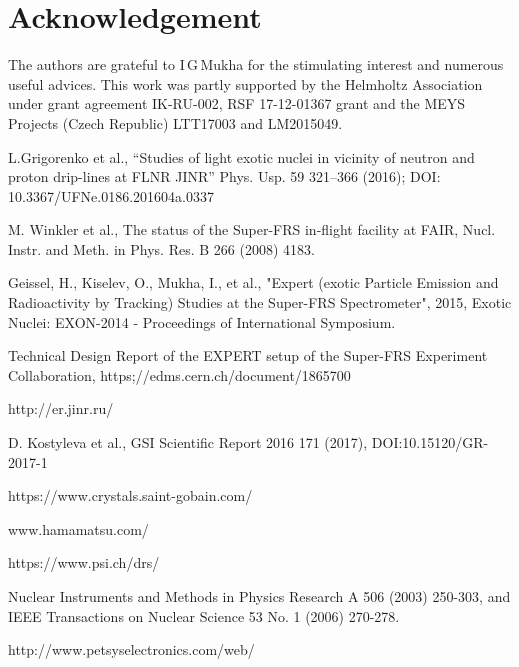 \documentclass{webofc}
\begin{document}
\section{Acknowledgement}
The authors are grateful to I\,G\,Mukha for the stimulating interest and numerous useful advices.
This  work was partly supported by the Helmholtz Association under grant agreement IK-RU-002, RSF 17-12-01367 grant and the MEYS Projects (Czech Republic) LTT17003 and LM2015049.
	
\begin{thebibliography}{99}
	L.Grigorenko et al., “Studies of light exotic nuclei in vicinity of neutron and proton drip-lines at FLNR JINR” Phys. Usp. 59 321–366 (2016); DOI: 10.3367/UFNe.0186.201604a.0337
		
	M. Winkler et al., The status of the Super-FRS in-flight facility at FAIR, Nucl. Instr. and Meth. in Phys. Res. B 266 (2008) 4183.
	
	Geissel, H., Kiselev, O., Mukha, I., et al., "Expert (exotic Particle Emission and Radioactivity by Tracking) Studies at the Super-FRS Spectrometer", 2015, Exotic Nuclei: EXON-2014 - Proceedings of International Symposium.
	
	Technical Design Report of the EXPERT setup of the Super-FRS Experiment Collaboration, https;//edms.cern.ch/document/1865700

	http://er.jinr.ru/

	D. Kostyleva et al., GSI Scientific Report 2016 171 (2017), DOI:10.15120/GR-2017-1
	
	https://www.crystals.saint-gobain.com/
	
	www.hamamatsu.com/
	
	https://www.psi.ch/drs/
	
	Nuclear Instruments and Methods in Physics Research A 506 (2003) 250-303, and
	IEEE Transactions on Nuclear Science 53 No. 1 (2006) 270-278.
	
	http://www.petsyselectronics.com/web/
	
\end{thebibliography}
\end{document}

